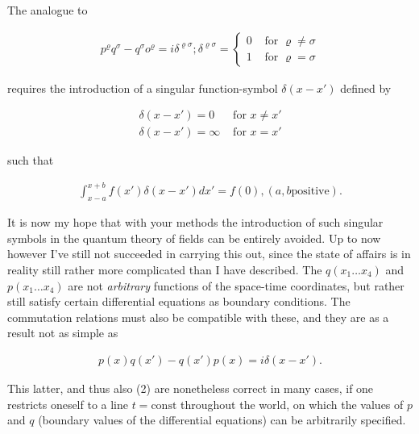 \documentclass{article}
\newcommand{\uequ}[1]{
\begin{align*}
#1
\end{align*}
}
\newcommand{\intXY}[2]{\int_{#1}^{#2}}
\begin{document}
The analogue to
\uequ{
p^\varrho q^\sigma - q^\sigma o^\varrho = i\delta^{\varrho \sigma}; 
\delta^{\varrho\sigma} = \begin{cases}
0 & \text{ for } \varrho \neq \sigma \\
1 & \text{ for } \varrho = \sigma
\end{cases}
}
requires the introduction of a singular function-symbol $\delta(x-x')$ defined by
\uequ{
\delta(x-x') = 0 & \text{ for } x \neq x' \\
\delta(x-x') = \infty & \text { for } x = x'
}
such that
\uequ{
\intXY{x-a}{x+b}f(x')\delta(x-x')dx' = f(0), (a,b \text{positive}).
}

It is now my hope that with your methods the introduction of such singular symbols in the quantum theory of fields can be entirely avoided. Up to now however I've still not succeeded in carrying this out, since the state of affairs is in reality still rather more complicated than I have described. The $q(x_1 \dots x_4)$ and $p(x_1 \dots x_4)$ are not \textit{arbitrary} functions of the space-time coordinates, but rather still satisfy certain differential equations as boundary conditions. The commutation relations must also be compatible with these, and they are as a result not as simple as 
\uequ{
p(x)q(x') - q(x')p(x) = i\delta(x-x').
}

This latter, and thus also (2) are nonetheless correct in many cases, if one restricts oneself to a line $t=\text{const}$ throughout the world, on which the values of $p$ and $q$ (boundary values of the differential equations) can be arbitrarily specified.
\end{document}
